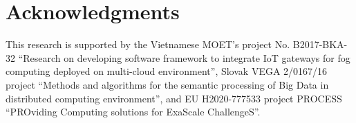 \documentclass[conference]{IEEEtran}
\begin{document}
\section*{Acknowledgments} This research is supported by
the Vietnamese MOET's project No. B2017-BKA-32 ``Research on developing software framework to integrate IoT gateways for fog computing deployed on multi-cloud environment'',
Slovak VEGA 2/0167/16 project ``Methods and algorithms for the semantic processing of Big Data in distributed computing environment'', and 
EU H2020-777533 project PROCESS ``PROviding Computing solutions for ExaScale ChallengeS''.

%

%
%
%
\end{document}

